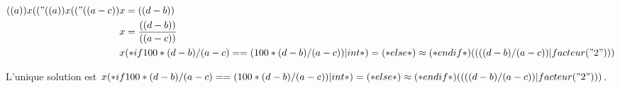 \exercice*

\begin{align*}
  (( a )) x (( "%
  (( a )) x (( "%
  (( a - c )) x &= (( d - b )) \\
  x &= \frac{(( d - b ))}{(( a - c ))} \\
  x &
        (* if 100*(d-b)/(a-c) == (100*(d-b)/(a-c))|int *)
            =
        (* else *)
            \approx
        (* endif *)
        (( ((d-b)/(a-c)) | facteur("2") ))
\end{align*}

L'unique solution est
$x
(* if 100*(d-b)/(a-c) == (100*(d-b)/(a-c))|int *)
    =
(* else *)
    \approx
(* endif *)
(( ((d-b)/(a-c)) | facteur("2") ))$.
